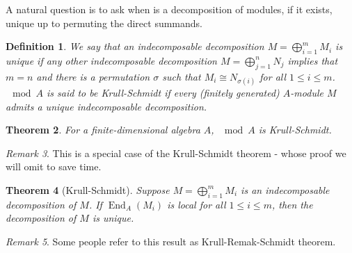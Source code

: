 \documentclass[11pt,a4paper]{article}
\numberwithin{equation}{section}
\theoremstyle{all}
\newtheorem{theorem}{Theorem}[section]
\newtheorem{definition}[theorem]{Definition}
\theoremstyle{remark}
\newtheorem{remark}[theorem]{Remark}
\newcommand{\End}{\operatorname{End}\nolimits}
\newcommand{\defn}[1]{\textsl{\color{darkblue} #1}}
\begin{document}
A natural question is to ask when is a decomposition of modules, if it exists, unique up to permuting the direct summands.

\begin{definition}
We say that an indecomposable decomposition $M=\bigoplus_{i=1}^m M_i$ is \defn{unique} if any other indecomposable decomposition $M=\bigoplus_{j=1}^n N_j$ implies that $m=n$ and there is a permutation $\sigma$ such that $M_i\cong N_{\sigma(i)}$ for all $1\leq i \leq m$.
$\mod A$ is said to be \defn{Krull-Schmidt} if every (finitely generated) $A$-module $M$ admits a unique indecomposable decomposition.
\end{definition}

\begin{theorem}
For a finite-dimensional algebra $A$, $\mod A$ is Krull-Schmidt.
\end{theorem}
\begin{remark}
This is a special case of the Krull-Schmidt theorem - whose proof we will omit to save time.
\end{remark}


\begin{theorem}[Krull-Schmidt]
Suppose $M=\bigoplus_{i=1}^m M_i$ is an indecomposable decomposition of $M$.  If $\End_A(M_i)$ is local for all $1\leq i\leq m$, then the decomposition of $M$ is unique.
\end{theorem}
\begin{remark}
Some people refer to this result as Krull-Remak-Schmidt theorem.
\end{remark}



\pagebreak 
\end{document}
